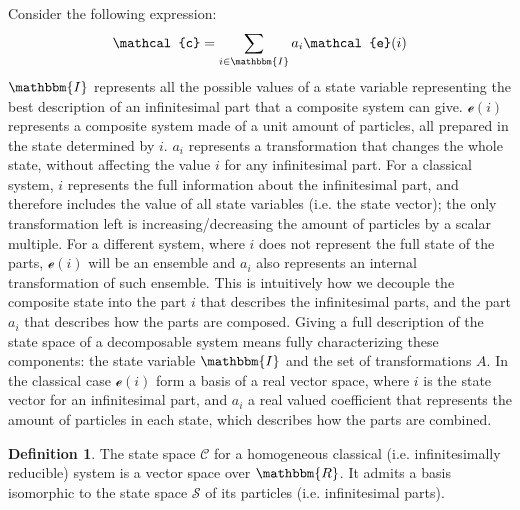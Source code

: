 \documentclass[aps,pra,10pt,twocolumn,floatfix,nofootinbib]{revtex4-1}
\theoremstyle{definition}
\newtheorem{defn}[prop]{Definition}
\begin{document}
Consider the following expression:
\begin{align*}
\mathcal{c} = \sum\limits_{i \in \mathbbm{I}} a_i \mathcal{e}(i)
\end{align*}
$\mathbbm{I}$ represents all the possible values of a state variable representing the best description of an infinitesimal part that a composite system can give. $\mathcal{e}(i)$ represents a composite system made of a unit amount of particles, all prepared in the state determined by $i$. $a_i$ represents a transformation that changes the whole state, without affecting the value $i$ for any infinitesimal part. For a classical system, $i$ represents the full information about the infinitesimal part, and therefore includes the value of all state variables (i.e. the state vector); the only transformation left is increasing/decreasing the amount of particles by a scalar multiple. For a different system, where $i$ does not represent the full state of the parts, $\mathcal{e}(i)$ will be an ensemble and $a_i$ also represents an internal transformation of such ensemble. This is intuitively how we decouple the composite state into the part $i$ that describes the infinitesimal parts, and the part $a_i$ that describes how the parts are composed. Giving a full description of the state space of a decomposable system means fully characterizing these components: the state variable $\mathbbm{I}$ and the set of transformations $A$. In the classical case $\mathcal{e}(i)$ form a basis of a real vector space, where $i$ is the state vector for an infinitesimal part, and $a_i$ a real valued coefficient that represents the amount of particles in each state, which describes how the parts are combined.

\begin{defn}\label{classical_vector space}
The state space $\mathcal{C}$ for a homogeneous classical (i.e. infinitesimally reducible) system is a vector space over $\mathbbm{R}$. It admits a basis isomorphic to the state space $\mathcal{S}$ of its particles (i.e. infinitesimal parts).
\end{defn}
\end{document}
